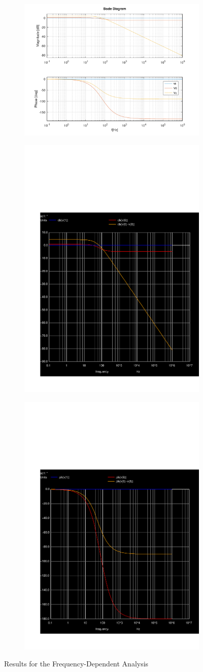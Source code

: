\begin{figure}
\centering
\begin{subfigure}{.5\textwidth}
  \centering
  \includegraphics[width=.4\linewidth]{../mat/t2-t6.pdf}
\end{subfigure}%
\begin{subfigure}{.5\textwidth}
  \centering
  \includegraphics[width=.4\linewidth]{../sim/db.pdf}
\end{subfigure}
\begin{subfigure}{.5\textwidth}
  \centering
  \includegraphics[width=.4\linewidth]{../sim/ph.pdf}
\end{subfigure}
\caption{Results for the Frequency-Dependent Analysis}
\label{fig:sbs3}
\end{figure}